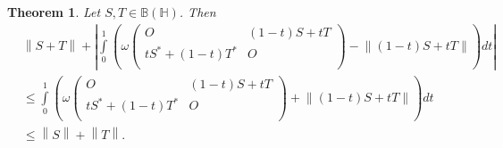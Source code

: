 \documentclass[10pt,a4paper]{amsart}
\newtheorem{theorem}{Theorem}
\begin{document}
\begin{theorem}\label{10}
Let $S,T\in \mathbb B\left( \mathbb H \right)$. Then
\[\begin{aligned}
  & \left\| S+T \right\|+\left| \int\limits_{0}^{1}{\left( \omega \left( \begin{matrix}
   O & \left( 1-t \right)S+tT  \\
   t{{S}^{*}}+\left( 1-t \right){{T}^{*}} & O  \\
\end{matrix} \right)-\left\| \left( 1-t \right)S+tT \right\| \right)dt} \right| \\ 
 & \le \int\limits_{0}^{1}{\left( \omega \left( \begin{matrix}
   O & \left( 1-t \right)S+tT  \\
   t{{S}^{*}}+\left( 1-t \right){{T}^{*}} & O  \\
\end{matrix} \right)+\left\| \left( 1-t \right)S+tT \right\| \right)dt} \\ 
 & \le \left\| S \right\|+\left\| T \right\|.
\end{aligned}\]
\end{theorem}
\end{document}
